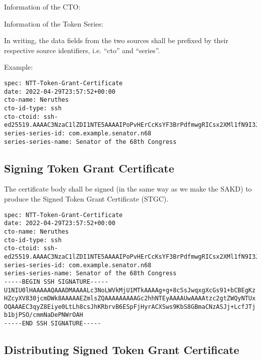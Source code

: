 Information of the CTO:

\begin{compactitem}
	\item {}
	\item {}
	\item {}
\end{compactitem}

Information of the Token Series:

\begin{compactitem}
	\item {}
	\item {}
\end{compactitem}

In writing, the data fields from the two sources shall be prefixed by their respective source identifiers, i.e. ``cto'' and ``series''.

Example:

\begin{lstlisting}
spec: NTT-Token-Grant-Certificate
date: 2022-04-29T23:57:52+00:00
cto-name: Neruthes
cto-id-type: ssh
cto-ctoid: ssh-ed25519.AAAAC3NzaC1lZDI1NTE5AAAAIPoPvHErCcKsYF3BrPdfmwgRICsx2XMl1fN9I3Jg1pPA
series-series-id: com.example.senator.n68
series-series-name: Senator of the 68th Congress
\end{lstlisting}


\subsection{Signing Token Grant Certificate}

The certificate body shall be signed (in the same way as we make the SAKD) to produce the Signed Token Grant Certificate (STGC).

\begin{lstlisting}
spec: NTT-Token-Grant-Certificate
date: 2022-04-29T23:57:52+00:00
cto-name: Neruthes
cto-id-type: ssh
cto-ctoid: ssh-ed25519.AAAAC3NzaC1lZDI1NTE5AAAAIPoPvHErCcKsYF3BrPdfmwgRICsx2XMl1fN9I3Jg1pPA
series-series-id: com.example.senator.n68
series-series-name: Senator of the 68th Congress
-----BEGIN SSH SIGNATURE-----
U1NIU0lHAAAAAQAAADMAAAALc3NoLWVkMjU1MTkAAAAg+g+8cSsJwqxgXcGs91+bCBEgKz
HZcyXV830jcmDWk8AAAAAEZmlsZQAAAAAAAAAGc2hhNTEyAAAAUwAAAAtzc2gtZWQyNTUx
OQAAAEC3qyZ8Eiye0LtLh8csJhKRbrvB6ESpFjHyrACXSws9KbS8GBmaCNzASJj+LcfJTj
b1bjPSO/cmmNaDePNWrOAH
-----END SSH SIGNATURE-----
\end{lstlisting}


\subsection{Distributing Signed Token Grant Certificate}

